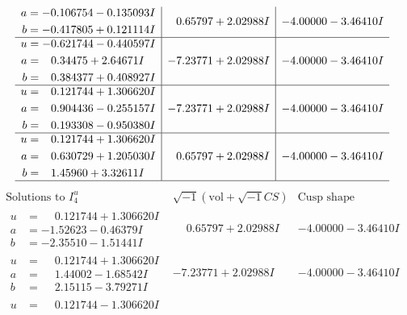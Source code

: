 \documentclass[1p]{elsarticle_modified}
\theoremstyle{definition}
\newcommand{\I}{\sqrt{-1}}
\begin{document}
$$\begin{array}{c|c|c}
\begin{aligned}
a &= -0.106754 - 0.135093 I \\
b &= -0.417805 + 0.121114 I\end{aligned}
 & \phantom{-}0.65797 + 2.02988 I & -4.00000 - 3.46410 I \\ \hline\begin{aligned}
u &= -0.621744 - 0.440597 I \\
a &= \phantom{-}0.34475 + 2.64671 I \\
b &= \phantom{-}0.384377 + 0.408927 I\end{aligned}
 & -7.23771 + 2.02988 I & -4.00000 - 3.46410 I \\ \hline\begin{aligned}
u &= \phantom{-}0.121744 + 1.306620 I \\
a &= \phantom{-}0.904436 - 0.255157 I \\
b &= \phantom{-}0.193308 - 0.950380 I\end{aligned}
 & -7.23771 + 2.02988 I & -4.00000 - 3.46410 I \\ \hline\begin{aligned}
u &= \phantom{-}0.121744 + 1.306620 I \\
a &= \phantom{-}0.630729 + 1.205030 I \\
b &= \phantom{-}1.45960 + 3.32611 I\end{aligned}
 & \phantom{-}0.65797 + 2.02988 I & -4.00000 - 3.46410 I\\
 \hline 
 \end{array}$$\newpage$$\begin{array}{c|c|c}  
\text{Solutions to }I^u_{4}& \I (\text{vol} + \sqrt{-1}CS) & \text{Cusp shape}\\
 \hline 
\begin{aligned}
u &= \phantom{-}0.121744 + 1.306620 I \\
a &= -1.52623 - 0.46379 I \\
b &= -2.35510 - 1.51441 I\end{aligned}
 & \phantom{-}0.65797 + 2.02988 I & -4.00000 - 3.46410 I \\ \hline\begin{aligned}
u &= \phantom{-}0.121744 + 1.306620 I \\
a &= \phantom{-}1.44002 - 1.68542 I \\
b &= \phantom{-}2.15115 - 3.79271 I\end{aligned}
 & -7.23771 + 2.02988 I & -4.00000 - 3.46410 I \\ \hline\begin{aligned}
u &= \phantom{-}0.121744 - 1.306620 I \\

\end{aligned}
\end{array}$$
\end{document}
